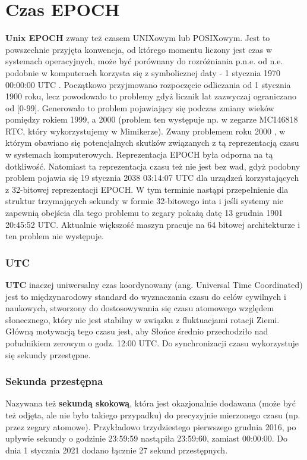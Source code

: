 \documentclass[shortabstract]{iithesis}
\theoremstyle{definition} \newtheorem*{definition}{Definicja}
\theoremstyle{definition} \newtheorem*{example}{Przykład}
\theoremstyle{definition} \newtheorem*{remark}{Uwaga}
\begin{document}
\section{Czas EPOCH}
\textbf{Unix EPOCH} zwany też czasem UNIXowym lub POSIXowym. Jest to powszechnie przyjęta konwencja, od którego momentu liczony jest czas w systemach operacyjnych, może być porównany do rozróżniania p.n.e. od n.e. podobnie w komputerach korzysta się z symbolicznej daty - 1 stycznia 1970 00:00:00 UTC \cite{bib:apue}. Początkowo przyjmowano rozpoczęcie odliczania od 1 stycznia 1900 roku, lecz powodowało to problemy gdyż licznik lat zazwyczaj ograniczano od [0-99]. Generowało to problem pojawiający się podczas zmiany wieków pomiędzy rokiem 1999, a 2000 (problem ten występuje np. w zegarze MC146818 RTC, który wykorzystujemy w Mimikerze). Zwany problemem roku 2000 \cite{bib:y2k}, w którym obawiano się potencjalnych skutków związanych z tą reprezentacją czasu w systemach komputerowych. Reprezentacja EPOCH była odporna na tą dotkliwość. Natomiast ta reprezentacja czasu też nie jest bez wad, gdyż podobny problem pojawia się 19 stycznia 2038 03:14:07 UTC dla urządzeń korzystających z 32-bitowej reprezentacji EPOCH. W tym terminie nastąpi przepełnienie dla struktur trzymających sekundy w formie 32-bitowego inta i jeśli systemy nie zapewnią obejścia dla tego problemu to zegary pokażą datę 13 grudnia 1901 20:45:52 UTC. Aktualnie większość maszyn pracuje na 64 bitowej architekturze i ten problem nie występuje.

\subsubsection{UTC}

\textbf{UTC} inaczej uniwersalny czas koordynowany (ang. Universal Time Coordinated) \cite{bib:utc} jest to międzynarodowy standard do wyznaczania czasu do celów cywilnych i naukowych, stworzony do dostosowywania się czasu atomowego względem słonecznego, który nie jest stabilny w związku z fluktuacjami rotacji Ziemi. Główną motywacją tego czasu jest, aby Słońce średnio przechodziło nad południkiem zerowym o godz. 12:00 UTC. Do synchronizacji czasu wykorzystuje się sekundy przestępne.

\subsubsection{Sekunda przestępna}
Nazywana też \textbf{sekundą skokową}, która jest okazjonalnie dodawana (może być też odjęta, ale nie było takiego przypadku) do precyzyjnie mierzonego czasu (np. przez zegary atomowe). Przykładowo trzydziestego pierwszego grudnia 2016, po upływie sekundy o godzinie 23:59:59 nastąpiła 23:59:60, zamiast 00:00:00. Do dnia 1 stycznia 2021 dodano łącznie 27 sekund przestępnych.
\end{document}
